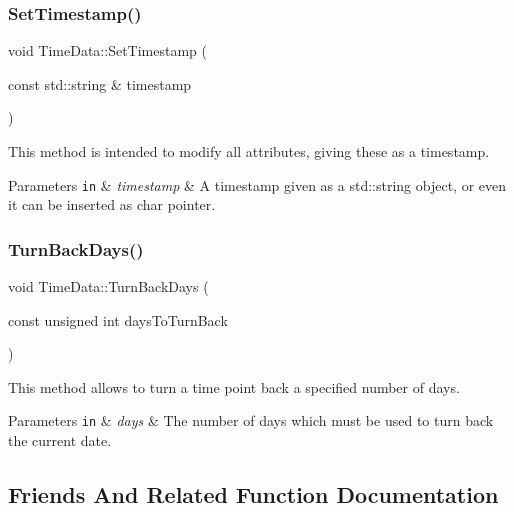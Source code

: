 \subsubsection{\texorpdfstring{Set\+Timestamp()}{SetTimestamp()}}
{\footnotesize\ttfamily void Time\+Data\+::\+Set\+Timestamp (\begin{DoxyParamCaption}\item[{const std\+::string \&}]{timestamp }\end{DoxyParamCaption})}



This method is intended to modify all attributes, giving these as a timestamp. 


\begin{DoxyParams}[1]{Parameters}
\mbox{\tt in}  & {\em timestamp} & A timestamp given as a {\ttfamily std\+::string} object, or even it can be inserted as {\ttfamily char} pointer. \\
\hline
\end{DoxyParams}
\mbox{\label{structTimeData_ad204062485d50c24aad1d4b41a582bd8}} 
\subsubsection{\texorpdfstring{Turn\+Back\+Days()}{TurnBackDays()}}
{\footnotesize\ttfamily void Time\+Data\+::\+Turn\+Back\+Days (\begin{DoxyParamCaption}\item[{const unsigned int}]{days\+To\+Turn\+Back }\end{DoxyParamCaption})}



This method allows to turn a time point back a specified number of days. 


\begin{DoxyParams}[1]{Parameters}
\mbox{\tt in}  & {\em days} & The number of days which must be used to turn back the current date. \\
\hline
\end{DoxyParams}


\subsection{Friends And Related Function Documentation}
\mbox{\label{structTimeData_a05ed1f021fd859fd0507d8ec74de5afd}} 

